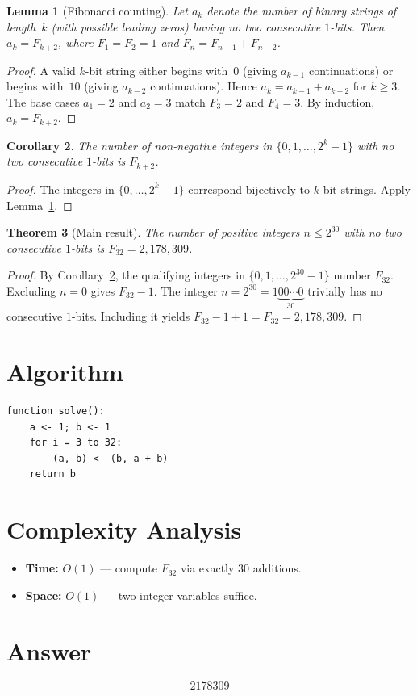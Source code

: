 \documentclass[12pt]{article}
\newtheorem{theorem}{Theorem}
\newtheorem{lemma}[theorem]{Lemma}
\newtheorem{corollary}[theorem]{Corollary}
\begin{document}
\begin{lemma}[Fibonacci counting]\label{lem:fib-count}
Let $a_k$ denote the number of binary strings of length~$k$ (with possible leading zeros) having no two consecutive $1$-bits. Then $a_k = F_{k+2}$, where $F_1 = F_2 = 1$ and $F_n = F_{n-1} + F_{n-2}$.
\end{lemma}

\begin{proof}
A valid $k$-bit string either begins with~$0$ (giving $a_{k-1}$ continuations) or begins with~$10$ (giving $a_{k-2}$ continuations). Hence $a_k = a_{k-1} + a_{k-2}$ for $k \ge 3$. The base cases $a_1 = 2$ and $a_2 = 3$ match $F_3 = 2$ and $F_4 = 3$. By induction, $a_k = F_{k+2}$.
\end{proof}

\begin{corollary}\label{cor:count-range}
The number of non-negative integers in $\{0, 1, \ldots, 2^k - 1\}$ with no two consecutive $1$-bits is $F_{k+2}$.
\end{corollary}

\begin{proof}
The integers in $\{0,\ldots,2^k-1\}$ correspond bijectively to $k$-bit strings. Apply Lemma~\ref{lem:fib-count}.
\end{proof}

\begin{theorem}[Main result]\label{thm:main}
The number of positive integers $n \le 2^{30}$ with no two consecutive $1$-bits is $F_{32} = 2{,}178{,}309$.
\end{theorem}

\begin{proof}
By Corollary~\ref{cor:count-range}, the qualifying integers in $\{0, 1, \ldots, 2^{30}-1\}$ number $F_{32}$. Excluding $n = 0$ gives $F_{32} - 1$. The integer $n = 2^{30} = 1\underbrace{00\cdots0}_{30}$ trivially has no consecutive $1$-bits. Including it yields $F_{32} - 1 + 1 = F_{32} = 2{,}178{,}309$.
\end{proof}

\section{Algorithm}
\begin{verbatim}
function solve():
    a <- 1; b <- 1
    for i = 3 to 32:
        (a, b) <- (b, a + b)
    return b
\end{verbatim}

\section{Complexity Analysis}
\begin{itemize}
    \item \textbf{Time:} $O(1)$ --- compute $F_{32}$ via exactly 30 additions.
    \item \textbf{Space:} $O(1)$ --- two integer variables suffice.
\end{itemize}

\section{Answer}

\[
\boxed{2178309}
\]
\end{document}
